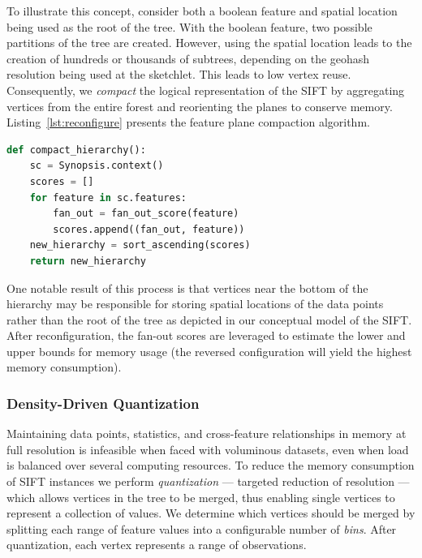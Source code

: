 \documentclass[9pt,journal,compsoc]{IEEEtran}
\begin{document}
To illustrate this concept, consider both a boolean feature and spatial location being used as the root of the tree. With the boolean feature, two possible partitions of the tree are created. However, using the spatial location leads to the creation of hundreds or thousands of subtrees, depending on the geohash resolution being used at the sketchlet. This leads to low vertex reuse. Consequently, we \emph{compact} the logical representation of the SIFT by aggregating vertices from the entire forest and reorienting the planes to conserve memory. Listing~\ref{lst:reconfigure} presents the feature plane compaction algorithm.

\begin{lstlisting}[language=Python,style=custompy,emph={fan_out_score,compact_hierarchy},caption={Feature plane compaction algorithm; the hierarchy is reconfigured based on sorted fan-out scores.},label={lst:reconfigure}]
def compact_hierarchy():
    sc = Synopsis.context()
    scores = []
    for feature in sc.features:
        fan_out = fan_out_score(feature)
        scores.append((fan_out, feature))
    new_hierarchy = sort_ascending(scores)
    return new_hierarchy
\end{lstlisting}

One notable result of this process is that vertices near the bottom of the hierarchy may be responsible for storing spatial locations of the data points rather than the root of the tree as depicted in our conceptual model of the SIFT.  After reconfiguration, the fan-out scores are leveraged to estimate the lower and upper bounds for memory usage (the reversed configuration will yield the highest memory consumption).

\subsubsection{Density-Driven Quantization}
Maintaining data points, statistics, and cross-feature relationships in memory at full resolution is infeasible when faced with voluminous datasets, even when load is balanced over several computing resources. To reduce the memory consumption of SIFT instances we perform \emph{quantization} --- targeted reduction of resolution --- which allows vertices in the tree to be merged, thus enabling single vertices to represent a collection of values. We determine which vertices should be merged by splitting each range of feature values into a configurable number of \emph{bins}. After quantization, each vertex represents a range of observations.
\end{document}
